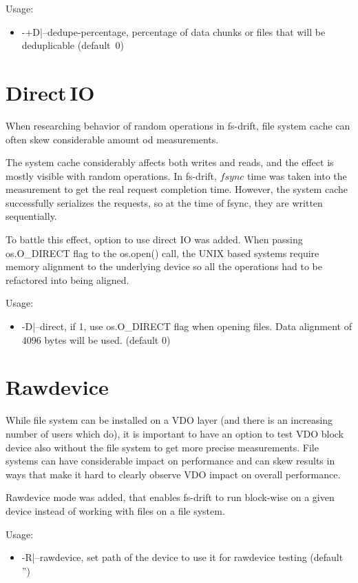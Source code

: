 \documentclass[
  color, %
  table, %
  lof,   %
  lot,   %
]{fithesis3}
\begin{document}
Usage:
\begin{itemize}
    \item -+D|--dedupe-percentage, percentage of data chunks or files that will be deduplicable (default~0)
\end{itemize}


\section{Direct\,IO}
When researching behavior of random operations in fs-drift, file system cache can often skew considerable amount od measurements.


The system cache considerably affects both writes and reads, and the effect is mostly visible with random operations. In fs-drift, $fsync$ time was taken into the measurement to get the real request completion time. However, the system cache successfully serializes the requests, so at the time of fsync, they are written sequentially.

To battle this effect, option to use direct IO was added. When passing os.O\_DIRECT flag to the os.open() call, the UNIX based systems require memory alignment to the underlying device so all the operations had to be refactored into being aligned.

Usage:
\begin{itemize}
    \item -D|--direct, if 1, use os.O\_DIRECT flag when opening files. Data alignment of 4096 bytes will be used. (default 0)
\end{itemize}

\section{Rawdevice}
While file system can be installed on a VDO layer (and there is an increasing number of users which do), it is important to have an option to test VDO block device also without the file system to get more precise measurements. File systems can have considerable impact on performance and can skew results in ways that make it hard to clearly observe VDO impact on overall performance.

Rawdevice mode was added, that enables fs-drift to run block-wise on a given device instead of working with files on a file system.

Usage:
\begin{itemize}
    \item -R|--rawdevice, set path of the device to use it for rawdevice testing (default '')
\end{itemize}
\end{document}
